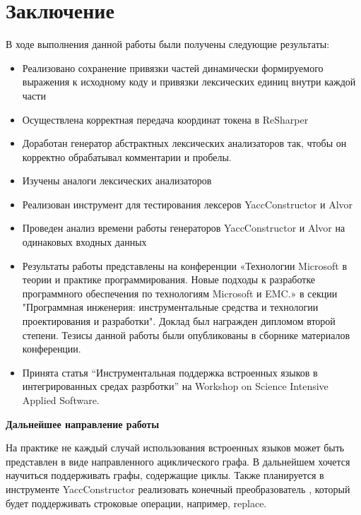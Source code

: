\documentclass{matmex-diploma}
\begin{document}
\section*{Заключение}
В ходе выполнения данной работы были получены следующие результаты:
\begin{itemize}
\item Реализовано сохранение привязки частей динамически формируемого выражения к исходному коду и привязки лексических единиц внутри каждой части
\item Осуществлена корректная передача координат токена в ReSharper
\item Доработан генератор абстрактных лексических анализаторов так, чтобы он корректно обрабатывал комментарии и пробелы.
\item Изучены аналоги лексических анализаторов
\item Реализован инструмент для тестирования лексеров YaccConstructor и Alvor
\item Проведен анализ времени работы генераторов YaccConstructor и Alvor на одинаковых входных данных
\item Результаты работы представлены на конференции «Технологии Microsoft в теории и практике программирования. 
Новые подходы к разработке программного обеспечения по технологиям Microsoft и EMC.» в секции "Программная инженерия: 
инструментальные средства и технологии проектирования и разработки". Доклад был награжден дипломом второй степени. 
Тезисы данной работы были опубликованы в сборнике материалов конференции.
\item Принята статья “Инструментальная поддержка встроенных языков в интегрированных средах разрботки” на Workshop on Science Intensive Applied Software.
\end{itemize}

\vspace{2 cm}
{\large{\textbf{Дальнейшее направление работы}}} 

На практике не каждый случай использования встроенных языков может быть представлен в виде направленного ациклического графа. 
В дальнейшем хочется научиться поддерживать графы, содержащие циклы. Также планируется в инструменте YaccConstructor реализовать 
конечный преобразователь \cite{Mehryar}, который будет поддерживать строковые операции, например, replace.




\end{document}
